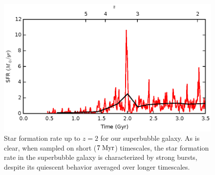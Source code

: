\begin{figure}
    \includegraphics[width=\columnwidth]{figures2/burstiness.eps}
    \caption[Superbubble star formation burstiness]{Star formation rate up to
    $z=2$ for our superbubble galaxy.  As is clear, when sampled on short ($7\;
    \rm{Myr}$) timescales, the star formation rate in the superbubble galaxy is
    characterized by strong bursts, despite its quiescent behavior averaged over
    longer timescales.}
    \label{burstiness}
\end{figure}
